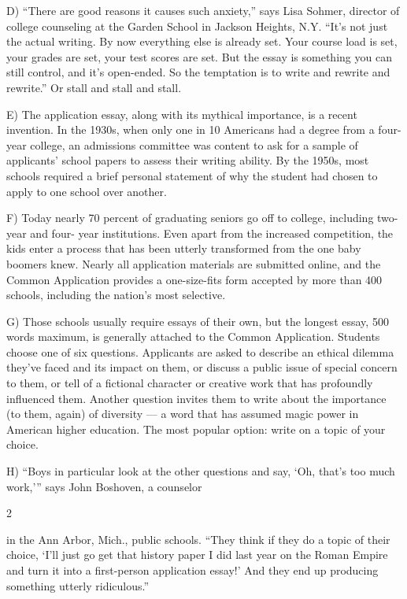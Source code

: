 \documentclass[UTF8,11pt]{ctexart}
\begin{document}
D) “There are good reasons it causes such anxiety,” says Lisa Sohmer, director of college counseling at the Garden School in Jackson Heights, N.Y. “It’s not just the actual writing. By now everything else is already set. Your course load is set, your grades are set, your test scores are set. But the essay is something you can still control, and it’s open-ended. So the temptation is to write and rewrite and rewrite.” Or stall and stall and stall.


E) The application essay, along with its mythical importance, is a recent invention. In the 1930s, when only one in 10 Americans had a degree from a four-year college, an admissions committee was content to ask for a sample of applicants’ school papers to assess their writing ability. By the 1950s, most schools required a brief personal statement of why the student had chosen to apply to one school over another.


F) Today nearly 70 percent of graduating seniors go off to college, including two-year and four- year institutions. Even apart from the increased competition, the kids enter a process that has been utterly transformed from the one baby boomers knew. Nearly all application materials are submitted online, and the Common Application provides a one-size-fits form accepted by more than 400 schools, including the nation’s most selective.


G) Those schools usually require essays of their own, but the longest essay, 500 words maximum, is generally attached to the Common Application. Students choose one of six questions. Applicants are asked to describe an ethical dilemma they’ve faced and its impact on them, or discuss a public issue of special concern to them, or tell of a fictional character or creative work that has profoundly influenced them. Another question invites them to write about the importance (to them, again) of diversity — a word that has assumed magic power in American higher education. The most popular option: write on a topic of your choice.


H) “Boys in particular look at the other questions and say, ‘Oh, that’s too much work,’” says John Boshoven, a counselor


2


in the Ann Arbor, Mich., public schools. “They think if they do a topic of their choice, ‘I’ll just go get that history paper I did last year on the Roman Empire and turn it into a first-person application essay!’ And they end up producing something utterly ridiculous.”
\end{document}
